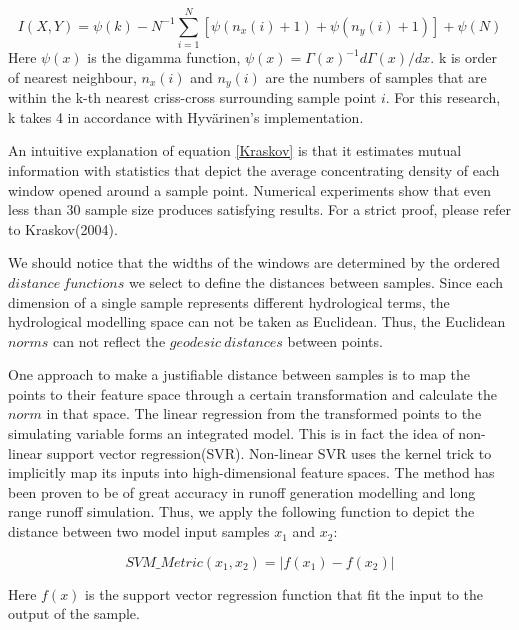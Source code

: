 \documentclass[review]{elsarticle}
\begin{document}
\begin{equation}\label{Kraskov}
I(X,Y)=\psi(k)-N^{-1}\sum_{i=1}^{N}[\psi(n_x(i)+1)+\psi(n_y(i)+1)]+\psi(N)
\end{equation}
Here $\psi(x)$ is the digamma function, $\psi(x)=\Gamma(x)^{-1}d\Gamma(x)/dx$. k is order of nearest neighbour, $n_x(i)$ and $n_y(i)$ are the numbers of samples that are within the k-th nearest  criss-cross surrounding sample point $i$. For this research, k takes 4 in accordance with Hyv{\"a}rinen's implementation.

An intuitive explanation of equation \ref{Kraskov} is that it estimates mutual information with statistics that depict the average concentrating density of each window opened around a sample point. Numerical experiments show that even less than 30 sample size produces satisfying results. For a strict proof, please refer to Kraskov(2004).

We should notice that the widths of the windows are determined by the ordered $distance~functions$ we select to define the distances between samples. Since each dimension of a single sample represents different hydrological terms, the hydrological modelling space can not be taken as Euclidean. Thus, the Euclidean $norms$ can not reflect the $geodesic      ~distances$ between points. 
 
 
One approach to make a justifiable distance between samples   is to map the points to their feature space through a certain transformation and calculate the $norm$ in that space. The linear regression from the transformed points to the simulating variable forms an integrated model. This is in fact the idea of non-linear support vector regression(SVR). Non-linear SVR uses the kernel trick to implicitly map its inputs into high-dimensional feature spaces. The method has been proven to be of great accuracy in runoff generation modelling\citep{dibike2001model,asefa2006multi,behzad2009generalization,phdgong} and long range runoff simulation\citep{lin2006using}. Thus, we apply the following function to depict the distance between two model input samples $x_1$ and $x_2$:

\begin{equation}\label{svm}
SVM\_Metric(x_1,x_2)=|f(x_1)-f(x_2)|
\end{equation}

Here $f(x)$ is the support vector regression function that fit the input to the output of the sample.   
\end{document}
